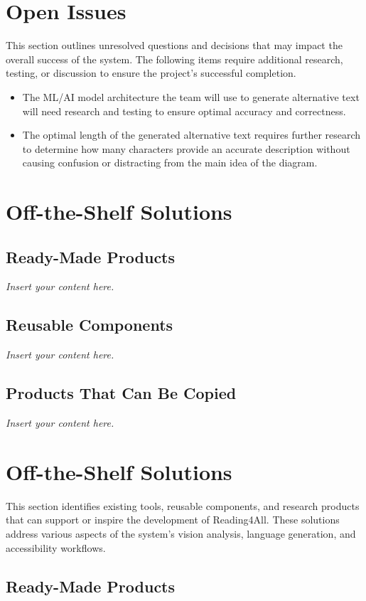 \documentclass[12pt]{article}
\newcommand{\lips}{\textit{Insert your content here.}}
\begin{document}
\section{Open Issues}
This section outlines unresolved questions and decisions that may impact the overall success of the system.
The following items require additional research, testing, or discussion to ensure the project’s successful completion. 
\begin{itemize}
  \item The ML/AI model architecture the team will use to generate alternative text will need research and testing 
  to ensure optimal accuracy and correctness.
  \item The optimal length of the generated alternative text requires further research to determine how many characters provide an 
  accurate description without causing confusion or distracting from the main idea of the diagram.
\end{itemize}

\section{Off-the-Shelf Solutions}
\subsection{Ready-Made Products}
\lips
\subsection{Reusable Components}
\lips
\subsection{Products That Can Be Copied}
\lips
\section{Off-the-Shelf Solutions}

This section identifies existing tools, reusable components, and research products that can support or inspire the development of Reading4All. These solutions address various aspects of the system’s vision analysis, language generation, and accessibility workflows.

\subsection{Ready-Made Products}
\end{document}
